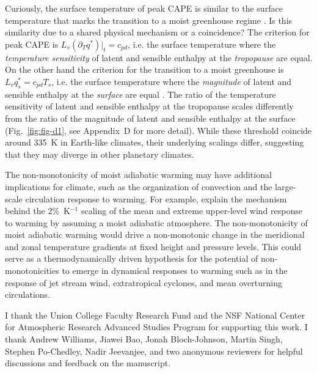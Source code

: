 \documentclass[]{ametsocV6.1}
\begin{document}
Curiously, the surface temperature of peak CAPE \citep[$\approx335$~K,][]{romps2016} is similar to the surface temperature that marks the transition to a moist greenhouse regime \citep[$\approx335$~K,][]{komabayasi1967, ingersoll1969, kasting1988}. Is this similarity due to a shared physical mechanism or a coincidence? The criterion for peak CAPE is $L_v(\partial_T q^*)|_t=c_{pd}$, i.e. the surface temperature where the \textit{temperature sensitivity} of latent and sensible enthalpy at the \textit{tropopause} are equal. On the other hand the criterion for the transition to a moist greenhouse is $L_vq_s^* = c_{pd}T_s$, i.e. the surface temperature where the \textit{magnitude} of latent and sensible enthalpy at the \textit{surface} are equal \citep{wordsworth2013}. The ratio of the temperature sensitivity of latent and sensible enthalpy at the tropopause scales differently from the ratio of the magnitude of latent and sensible enthalpy at the surface (Fig.~\ref{fig:fig-d1}, see Appendix~D for more detail). While these threshold coincide around 335~K in Earth-like climates, their underlying scalings differ, suggesting that they may diverge in other planetary climates.

The non-monotonicity of moist adiabatic warming may have additional implications for climate, such as the organization of convection and the large-scale circulation response to warming. For example, \cite{shaw2025a}  explain the mechanism behind the $2\%$~K$^{-1}$ scaling of the mean and extreme upper-level wind response to warming by assuming a moist adiabatic atmosphere. The non-monotonicity of moist adiabatic warming would drive a non-monotonic change in the meridional and zonal temperature gradients at fixed height and pressure levels. This could serve as a thermodynamically driven hypothesis for the potential of non-monotonicities to emerge in dynamical responses to warming such as in the response of jet stream wind, extratropical cyclones, and mean overturning circulations.

\acknowledgments
I thank the Union College Faculty Research Fund and the NSF National Center for Atmospheric Research Advanced Studies Program for supporting this work. I thank Andrew Williams, Jiawei Bao, Jonah Bloch-Johnson, Martin Singh, Stephen Po-Chedley, Nadir Jeevanjee, and two anonymous reviewers for helpful discussions and feedback on the manuscript.
\end{document}
